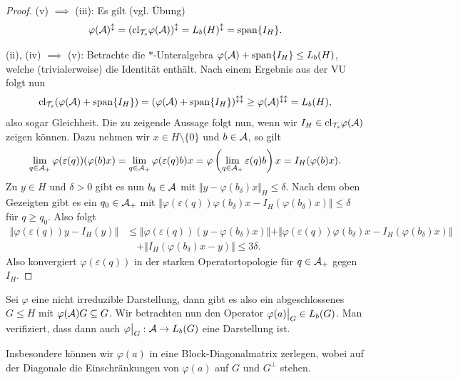\begin{proof}
    (v) $\implies$ (iii): Es gilt (vgl. Übung)
    \[
        \varphi(\mathcal{A})^\updownarrow = (\mathrm{cl}_{\mathcal{T}_s} \varphi(\mathcal{A}))^\updownarrow = L_b(H)^\updownarrow = \mathrm{span} \{ I_H \}.
    \]

    (ii), (iv) $\implies$ (v): Betrachte die $\ast$-Unteralgebra $\varphi(\mathcal{A}) + \mathrm{span} \{ I_H \} \leq L_b(H)$, welche (trivialerweise) die Identität enthält. Nach einem Ergebnis aus der VU folgt nun
    \[
        \mathrm{cl}_{\mathcal{T}_s} (\varphi(\mathcal{A}) + \mathrm{span} \{ I_H \})
        =
        (\varphi(\mathcal{A}) + \mathrm{span} \{ I_H \})^{\updownarrow \updownarrow}
        \geq
        \varphi(\mathcal{A})^{\updownarrow\updownarrow}
        =
        L_b(H),
    \]
    also sogar Gleichheit. Die zu zeigende Aussage folgt nun, wenn wir $I_H \in \mathrm{cl}_{\mathcal{T}_s} \varphi(\mathcal{A})$ zeigen können. Dazu nehmen wir $x \in H \setminus \{0\}$ und $b \in \mathcal{A}$, so gilt
    \[
        \lim_{q \in \mathcal{A}_+} \varphi(\varepsilon(q))(\varphi(b) x)
        =
        \lim_{q \in \mathcal{A}_+} \varphi(\varepsilon(q) b) x
        =
        \varphi \left( \lim_{q \in \mathcal{A}_+} \varepsilon(q) b \right) x
        =
        I_H(\varphi(b) x).
    \]
    Zu $y \in H$ und $\delta > 0$ gibt es nun $b_\delta \in \mathcal{A}$ mit $\Vert y - \varphi(b_\delta) x \Vert_H \leq \delta$. Nach dem oben Gezeigten gibt es ein $q_0 \in \mathcal{A}_+$ mit $\Vert \varphi(\varepsilon(q)) \varphi(b_\delta) x - I_H(\varphi(b_\delta) x) \Vert \leq \delta$ für $q \geq q_0$. Also folgt
    \begin{align*}
        \Vert \varphi(\varepsilon(q)) y - I_H (y) \Vert
        &\leq
        \Vert \varphi(\varepsilon(q)) (y - \varphi(b_\delta) x) \Vert
        + \Vert \varphi(\varepsilon(q)) \varphi(b_\delta) x - I_H(\varphi(b_\delta) x) \Vert
        \\ & \quad + \Vert I_H(\varphi(b_\delta) x - y) \Vert
        \leq 3 \delta.
    \end{align*}
    Also konvergiert $\varphi(\varepsilon(q))$ in der starken Operatortopologie für $q \in \mathcal{A}_+$ gegen $I_H$.
\end{proof}

\begin{remark}
    Sei $\varphi$ eine nicht irreduzible Darstellung, dann gibt es also ein abgeschlossenes $G \leq H$ mit $\varphi(\mathcal{A}) G \subseteq G$. Wir betrachten nun den Operator $\restr{\varphi(a)}{G} \in L_b(G)$. Man verifiziert, dass dann auch $\restr{\varphi}{G} : \Aa \to L_b(G)$ eine Darstellung ist.

    Insbesondere können wir $\varphi(a)$ in eine Block-Diagonalmatrix zerlegen, wobei auf der Diagonale die Einschränkungen von $\varphi(a)$ auf $G$ und $G^\perp$ stehen.
\end{remark}

